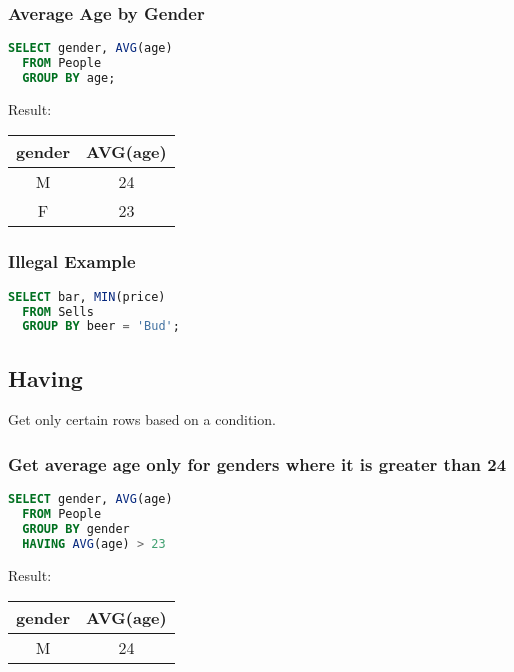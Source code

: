 \documentclass[12pt]{article}
\begin{document}
\subsubsection{Average Age by Gender}
\begin{lstlisting}[language=SQL]
  SELECT gender, AVG(age)
  FROM People
  GROUP BY age;
\end{lstlisting}

Result:
\begin{tabular}{|c|c|}
  \hline
  gender & AVG(age)\\ 
  \hline
  M & 24\\ 
  F & 23\\ 
  \hline
\end{tabular}

\subsubsection{Illegal Example}
\begin{lstlisting}[language=SQL]
  SELECT bar, MIN(price)
  FROM Sells
  GROUP BY beer = 'Bud';
\end{lstlisting}

\subsection{Having}
Get only certain rows based on a condition.
\subsubsection{Get average age only for genders where it is greater than 24}
\begin{lstlisting}[language=SQL]
  SELECT gender, AVG(age)
  FROM People
  GROUP BY gender
  HAVING AVG(age) > 23
\end{lstlisting}
Result:
\begin{tabular}{|c|c|}
  \hline
  gender & AVG(age)\\ 
  \hline
  M & 24\\ 
  \hline
\end{tabular}
\end{document}

